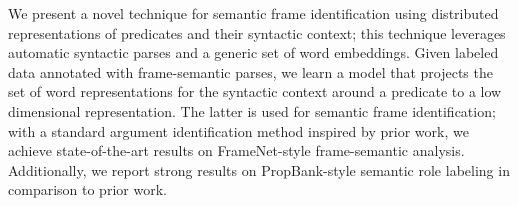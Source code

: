 We present a novel technique for semantic frame identification using distributed representations of predicates and their syntactic context; this technique leverages automatic syntactic parses and a generic set of word embeddings. Given labeled data annotated with frame-semantic parses, we learn a model that projects the set of word representations for the syntactic context around a predicate to a low dimensional representation. The latter is used for semantic frame identification; with a standard argument identification method inspired by prior work, we achieve state-of-the-art results on FrameNet-style frame-semantic analysis. Additionally, we report strong results on PropBank-style semantic role labeling in comparison to prior work.
